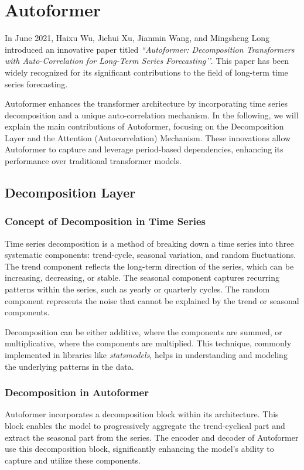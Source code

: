 \section{Autoformer}
In June 2021, Haixu Wu, Jiehui Xu, Jianmin Wang, and Mingsheng Long introduced an innovative paper titled \textit{``Autoformer: Decomposition Transformers with Auto-Correlation for Long-Term Series Forecasting’'}. This paper has been widely recognized for its significant contributions to the field of long-term time series forecasting.

Autoformer enhances the transformer architecture by incorporating time series decomposition and a unique auto-correlation mechanism. In the following, we will explain the main contributions of Autoformer, focusing on the Decomposition Layer and the Attention (Autocorrelation) Mechanism. These innovations allow Autoformer to capture and leverage period-based dependencies, enhancing its performance over traditional transformer models.

\subsection{Decomposition Layer}
\subsubsection{Concept of Decomposition in Time Series}
Time series decomposition is a method of breaking down a time series into three systematic components: trend-cycle, seasonal variation, and random fluctuations. The trend component reflects the long-term direction of the series, which can be increasing, decreasing, or stable. The seasonal component captures recurring patterns within the series, such as yearly or quarterly cycles. The random component represents the noise that cannot be explained by the trend or seasonal components.

Decomposition can be either additive, where the components are summed, or multiplicative, where the components are multiplied. This technique, commonly implemented in libraries like \textit{statsmodels}, helps in understanding and modeling the underlying patterns in the data.

\subsubsection{Decomposition in Autoformer}
Autoformer incorporates a decomposition block within its architecture. This block enables the model to progressively aggregate the trend-cyclical part and extract the seasonal part from the series. The encoder and decoder of Autoformer use this decomposition block, significantly enhancing the model’s ability to capture and utilize these components.

